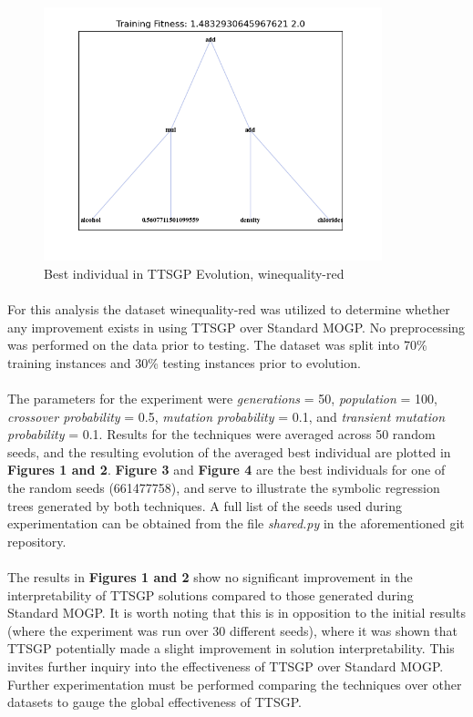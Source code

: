 \documentclass[a4paper]{article}
\begin{document}
\begin{figure}[H]
	\caption{Best individual in TTSGP Evolution, winequality-red}
	\centering
	\includegraphics[width=0.875\textwidth]{winequality-red-TTSGP-ex}
\end{figure}
\paragraph{}For this analysis the dataset winequality-red was utilized to determine whether any improvement exists in using TTSGP over Standard MOGP. No preprocessing was performed on the data prior to testing. The dataset was split into 70\% training instances and 30\% testing instances prior to evolution.
\paragraph{}The parameters for the experiment were \textit{generations} = 50, \textit{population} = 100, \textit{crossover probability} = 0.5, \textit{mutation probability} = 0.1, and \textit{transient mutation probability} = 0.1. Results for the techniques were averaged across 50 random seeds, and the resulting evolution of the averaged best individual are plotted in \textbf{Figures 1 and 2}. \textbf{Figure 3} and \textbf{Figure 4} are the best individuals for one of the random seeds (661477758), and serve to illustrate the symbolic regression trees generated by both techniques. A full list of the seeds used during experimentation can be obtained from the file \textit{shared.py} in the aforementioned git repository. 
\paragraph{} The results in \textbf{Figures 1 and 2} show no significant improvement in the interpretability of TTSGP solutions compared to those generated during Standard MOGP. It is worth noting that this is in opposition to the initial results (where the experiment was run over 30 different seeds), where it was shown that TTSGP potentially made a slight improvement in solution interpretability. This invites further inquiry into the effectiveness of TTSGP over Standard MOGP. Further experimentation must be performed comparing the techniques over other datasets to gauge the global effectiveness of TTSGP.
\end{document}
